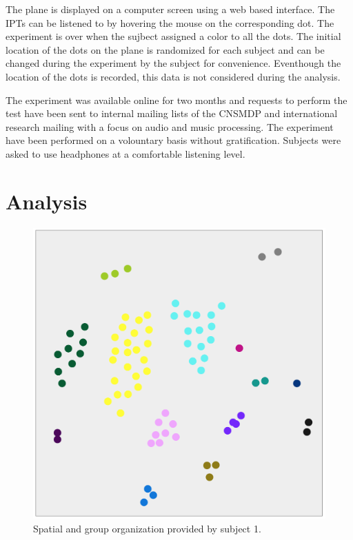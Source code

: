 \documentclass{article}
\newcommand{\ipts}{IPTs\xspace}
\begin{document}
The plane is displayed on a computer screen using a web based interface. The \ipts can be listened to by hovering the mouse on the corresponding dot. The experiment is over when the sujbect assigned a color to all the dots. The initial location of the dots on the plane is randomized for each subject and can be changed during the experiment by the subject for convenience. Eventhough the location of the dots is recorded, this data is not considered during the analysis.

The experiment was available online for two months and requests to perform the test have been sent to internal mailing lists of the CNSMDP and international research mailing with a focus on audio and music processing. The experiment have been performed on a volountary basis without gratification. Subjects were asked to use headphones at a comfortable listening level.

\section{Analysis}\label{sec:analysis}

\begin{figure}
\center
\includegraphics[width = \textwidth]{figures/xp2example.png}
\caption{Spatial and group organization provided by subject 1.}
\label{fig:xp2display}
\end{figure}
\end{document}

